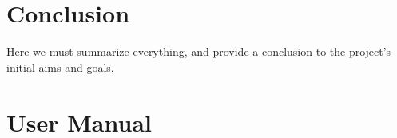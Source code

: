 \documentclass[11pt,a4paper]{article}
\begin{document}
\section{Conclusion}
\label{s:conclusion}

Here we must summarize everything, and provide a conclusion to the project's
initial aims and goals.
\appendix
\section{User Manual}
\label{s:user-manual}

\end{document}
